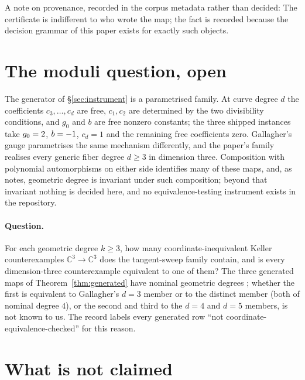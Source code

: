 \documentclass[11pt]{article}
\newcommand{\C}{\mathbb{C}}
\begin{document}
A note on provenance, recorded in the corpus metadata rather than decided: \PhiProvenance{}
The certificate is indifferent to who wrote the map; the fact is recorded because the decision
grammar of this paper exists for exactly such objects.

\section{The moduli question, open}\label{sec:moduli}

The generator of \S\ref{sec:instrument} is a parametrised family. At curve degree $d$ the
coefficients $c_3,\dots,c_d$ are free, $c_1,c_2$ are determined by the two divisibility
conditions, and $g_0$ and $b$ are free nonzero constants; the three shipped instances take
$g_0=2$, $b=-1$, $c_d=1$ and the remaining free coefficients zero. Gallagher's gauge
parametrises the same mechanism differently, and the paper's family realises every generic fiber
degree $d\ge3$ in dimension three. Composition with polynomial automorphisms on either side
identifies many of these maps, and, as \cite{Gao2026} notes, geometric degree is invariant under
such composition; beyond that invariant nothing is decided here, and no equivalence-testing
instrument exists in the repository.

\paragraph{Question.} For each geometric degree $k\ge3$, how many coordinate-inequivalent
Keller counterexamples $\C^3\to\C^3$ does the tangent-sweep family contain, and is every
dimension-three counterexample equivalent to one of them? The three generated maps of
Theorem~\ref{thm:generated} have nominal geometric degrees \GenGeomDegrees{}; whether the first
is equivalent to Gallagher's $d=3$ member or to the distinct member (both of nominal degree $4$),
or the second and third to the $d=4$ and $d=5$ members, is not known to us. The record labels
every generated row ``not coordinate-equivalence-checked'' for this reason.

\section{What is not claimed}\label{sec:not}
\end{document}
